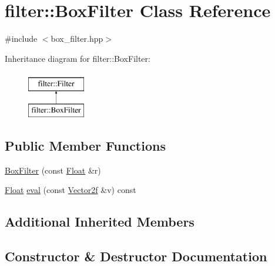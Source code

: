 \hypertarget{classfilter_1_1BoxFilter}{}\section{filter\+::Box\+Filter Class Reference}
\label{classfilter_1_1BoxFilter}


{\ttfamily \#include $<$box\+\_\+filter.\+hpp$>$}

Inheritance diagram for filter\+::Box\+Filter\+:\begin{figure}[H]
\begin{center}
\leavevmode
\includegraphics[height=2.000000cm]{classfilter_1_1BoxFilter}
\end{center}
\end{figure}
\subsection*{Public Member Functions}
\begin{DoxyCompactItemize}
\item 
\mbox{\hyperlink{classfilter_1_1BoxFilter_a5875622014b2ae53672fc8e013ab5c79}{Box\+Filter}} (const \mbox{\hyperlink{cyclop_8hpp_a07afd7094cb489cbd514c76e6f55d34f}{Float}} \&r)
\item 
\mbox{\hyperlink{cyclop_8hpp_a07afd7094cb489cbd514c76e6f55d34f}{Float}} \mbox{\hyperlink{classfilter_1_1BoxFilter_ac7219a821f510523fef5db0b3b5830d7}{eval}} (const \mbox{\hyperlink{cyclop_8hpp_a0c5eff6545fe0b71d0592c88d930b697}{Vector2f}} \&v) const
\end{DoxyCompactItemize}
\subsection*{Additional Inherited Members}


\subsection{Constructor \& Destructor Documentation}
\mbox{\label{classfilter_1_1BoxFilter_a5875622014b2ae53672fc8e013ab5c79}} 
